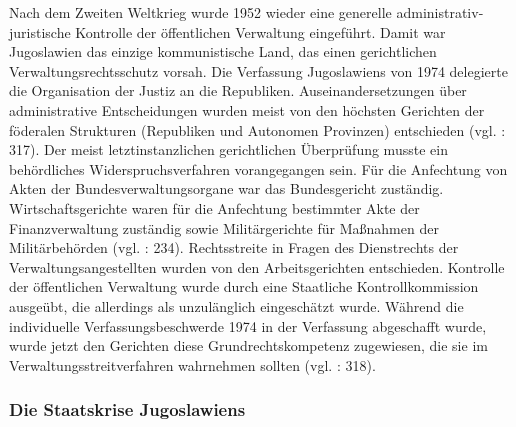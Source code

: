 Nach dem Zweiten Weltkrieg wurde 1952 wieder eine generelle administrativ-juristische Kontrolle der öffentlichen Verwaltung eingeführt. Damit war Jugoslawien das einzige kommunistische Land, das einen gerichtlichen Verwaltungsrechtsschutz vorsah. Die Verfassung Jugoslawiens von 1974 delegierte die Organisation der Justiz an die Republiken. Auseinandersetzungen über administrative Entscheidungen wurden meist von den höchsten Gerichten der föderalen Strukturen (Republiken und Autonomen Provinzen) entschieden (vgl. \cite{roggemann}: 317). Der meist letztinstanzlichen gerichtlichen Überprüfung musste ein behördliches Widerspruchsverfahren vorangegangen sein. Für die Anfechtung von Akten der Bundesverwaltungsorgane war das Bundesgericht zuständig. Wirtschaftsgerichte waren für die Anfechtung bestimmter Akte der Finanzverwaltung zuständig sowie Militärgerichte für Maßnahmen der Militärbehörden (vgl. \cite{beckm90}: 234). Rechtsstreite in Fragen des Dienstrechts der Verwaltungsangestellten wurden von den Arbeitsgerichten entschieden. Kontrolle der öffentlichen Verwaltung wurde durch eine Staatliche Kontrollkommission ausgeübt, die allerdings als unzulänglich eingeschätzt wurde. Während die individuelle Verfassungsbeschwerde 1974 in der Verfassung abgeschafft wurde, wurde jetzt den Gerichten diese Grundrechtskompetenz zugewiesen, die sie im Verwaltungsstreitverfahren wahrnehmen sollten (vgl. \cite{roggemann}: 318).

\subsubsection{Die Staatskrise Jugoslawiens}

